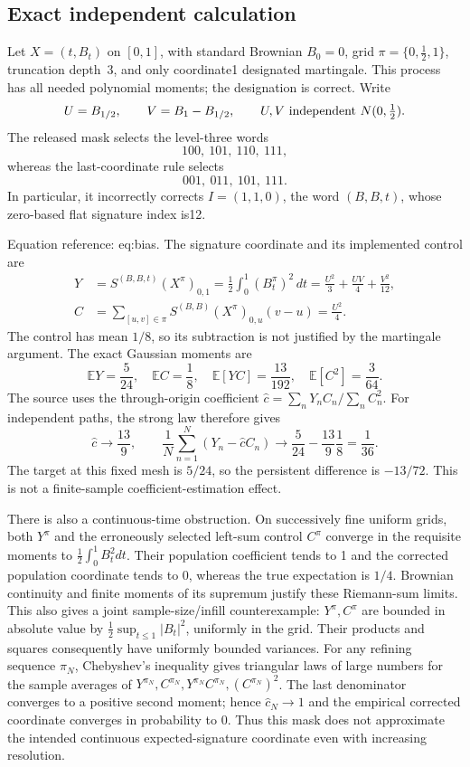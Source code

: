 \documentclass[10pt]{article}
\begin{document}
\subsection*{Exact independent calculation}
Let \(X=(t,B_t)\) on \([0,1]\), with standard Brownian \(B_0=0\), grid \(\pi=\{0,\tfrac12,1\}\), truncation depth 3, and only coordinate1 designated martingale. This process has all needed polynomial moments; the designation is correct. Write \[U=B_{1/2},\qquad V=B_1-B_{1/2},
 \qquad U,V\ \hbox{independent }N(0,\tfrac12).\] The released mask selects the level-three words \[100,\ 101,\ 110,\ 111,\] whereas the last-coordinate rule selects \[001,\ 011,\ 101,\ 111.\] In particular, it incorrectly corrects \(I=(1,1,0)\), the word \((B,B,t)\), whose zero-based flat signature index is12.\par
Equation reference: eq:bias. The signature coordinate and its implemented control are \[\begin{aligned}
 Y&=S^{(B,B,t)}(X^\pi)_{0,1}
   =\frac12\int_0^1(B_t^\pi)^2\,dt
   =\frac{U^2}{3}+\frac{UV}{4}+\frac{V^2}{12},\\
 C&=\sum_{[u,v]\in\pi}S^{(B,B)}(X^\pi)_{0,u}(v-u)
   =\frac{U^2}{4}.\end{aligned}\] The control has mean \(1/8\), so its subtraction is not justified by the martingale argument. The exact Gaussian moments are \[\mathbb EY=\frac5{24},\quad \mathbb EC=\frac18,\quad
 \mathbb E[YC]=\frac{13}{192},\quad \mathbb E[C^2]=\frac3{64}.\] The source uses the through-origin coefficient \(\widehat c=\sum_nY_nC_n/\sum_nC_n^2\). For independent paths, the strong law therefore gives \[
 \widehat c\longrightarrow\frac{13}{9},\qquad
 \frac1N\sum_{n=1}^N(Y_n-\widehat c C_n)
 \longrightarrow\frac5{24}-\frac{13}{9}\frac18=\frac1{36}.\] The target at this fixed mesh is \(5/24\), so the persistent difference is \(-13/72\). This is not a finite-sample coefficient-estimation effect.\par
There is also a continuous-time obstruction. On successively fine uniform grids, both \(Y^\pi\) and the erroneously selected left-sum control \(C^\pi\) converge in the requisite moments to \(\tfrac12\int_0^1B_t^2dt\). Their population coefficient tends to 1 and the corrected population coordinate tends to 0, whereas the true expectation is \(1/4\). Brownian continuity and finite moments of its supremum justify these Riemann-sum limits. This also gives a joint sample-size/infill counterexample: \(Y^\pi,C^\pi\) are bounded in absolute value by \(\tfrac12\sup_{t\le1}|B_t|^2\), uniformly in the grid. Their products and squares consequently have uniformly bounded variances. For any refining sequence \(\pi_N\), Chebyshev’s inequality gives triangular laws of large numbers for the sample averages of \(Y^{\pi_N},C^{\pi_N},Y^{\pi_N}C^{\pi_N},(C^{\pi_N})^2\). The last denominator converges to a positive second moment; hence \(\widehat c_N\to 1\) and the empirical corrected coordinate converges in probability to 0. Thus this mask does not approximate the intended continuous expected-signature coordinate even with increasing resolution.\par
\end{document}
